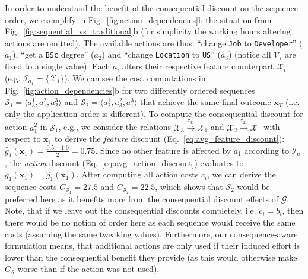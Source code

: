 \documentclass[runningheads, envcountsame, a4paper]{llncs}
\newcommand{\action}{a}
\newcommand{\Values}{\mathcal{V}}
\newcommand{\state}{\mathbf{x}}
\newcommand{\featurespace}{\mathcal{X}}
\newcommand{\feature}{\dddot{\featurespace}}
\newcommand{\featureindex}{\mathcal{I}}
\newcommand{\transition}{\tau}
\newcommand{\sequence}{\mathcal{S}}
\newcommand{\dependencyGraph}{\mathcal{G}}
\newcommand{\consequentialCosts}{g}
\newcommand{\baseCosts}{b}
\newcommand{\costs}{c}
\newcommand{\totalCosts}{C}
\newcommand{\finalsolution}{\state_{T}}
\begin{document}
In order to understand the benefit of the consequential discount on the sequence order, we exemplify in Fig.~\ref{fig:action_dependencies}b the situation from Fig.~\ref{fig:sequential_vs_traditional}b (for simplicity the working hours altering actions are omitted). The available actions are thus: \enquote{change \texttt{Job} to \texttt{Developer}} ($\action_1$), \enquote{get a \texttt{BSc} degree} ($\action_2$) and \enquote{change \texttt{Location} to \texttt{US}} ($\action_3$) (notice all $\Values_i$ are fixed to a single value). Each $\action_i$ alters their respective feature counterpart $\feature_i$ (e.g. $\featureindex_{\action_1} = \{\feature_1\}$). We can see the cost computations in Fig.~\ref{fig:action_dependencies}b for two differently ordered sequences $\sequence_1 = \langle \action^1_3, \action^2_1, \action^3_2 \rangle$ and $\sequence_2 = \langle \action^1_2, \action^2_3, \action^3_1 \rangle$ that achieve the same final outcome $\finalsolution$ (i.e. only the application order is different).
To compute the consequential discount for action $\action^2_1$ in $\sequence_1$, e.g., we consider the relations $\feature_3 \xrightarrow{\transition_{31}} \feature_1$ and $\feature_2 \xrightarrow{\transition_{21}} \feature_1$ with respect to $\state_1$ to derive the \emph{feature} discount (Eq.~\ref{eq:avg_feature_discount}): $\hat{\consequentialCosts}_{1}(\state_{1}) = \frac{0.5+1.0}{2} = 0.75$. Since no other feature is affected by $\action_1$ according to $\featureindex_{\action_1}$, the \emph{action} discount (Eq.~\ref{eq:avg_action_discount}) evaluates to $\consequentialCosts_1(\state_1) = \hat{\consequentialCosts}_{1}(\state_1)$.
After computing all action costs $\costs_i$, we can derive the sequence costs $\totalCosts_{\sequence_1} = 27.5$ and $\totalCosts_{\sequence_2} = 22.5$, which shows that $\sequence_2$ would be preferred here as it benefits more from the consequential discount effects of $\dependencyGraph$.
Note, that if we leave out the consequential discounts completely, i.e. $\costs_i = \baseCosts_i$, then there would be no notion of order here as each sequence would receive the same costs (assuming the same tweaking values).
Furthermore, our consequence-aware formulation means, that additional actions are only used if their induced effort is lower than the consequential benefit they provide (as this would otherwise make $\totalCosts_\sequence$ worse than if the action was not used).
\end{document}
